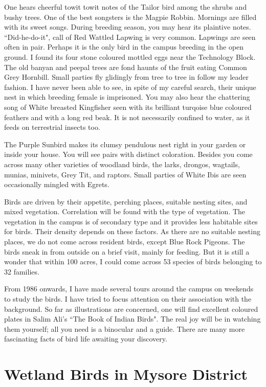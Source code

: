 One hears cheerful towit towit notes of the Tailor bird among the 
shrubs and bushy trees. One of the best songsters is the Magpie Robbin. 
Mornings are filled with its sweet songs. During breeding season, you may 
hear its plaintive notes. ``Did-he-do-it", call of Red Wattled Lapwing is very 
common. Lapwings are seen often in pair. Perhaps it is the only bird in the 
campus breeding in the open ground. I found its four stone coloured mottled 
eggs near the Technology Block. The old banyan and peepal trees are fond 
haunts of the fruit eating Common Grey Hornbill. Small parties fly 
glidingly from tree to tree in follow my leader fashion. I have never been 
able to see, in spite of my careful search, their unique nest in which breeding 
female is imprisoned. You may also hear the chattering song of 
White breasted Kingfisher seen with its brilliant turqoise blue coloured 
feathers and with a long red beak. It is not necessarily confined to water, as 
it feeds on terrestrial insects too. 

The Purple Sunbird makes its clumsy pendulous nest right in your 
garden or inside your house. You will see pairs with distinct coloration. 
Besides you come across many other varieties of woodland birds, the larks, 
drongos, wagtails, munias, minivets, Grey Tit, and raptors. Small parties of 
White Ibis are seen occasionally mingled with Egrets. 

Birds are driven by their appetite, perching places, suitable nesting 
sites, and mixed vegetation. Correlation will be found with the type of 
vegetation. The vegetation in the campus is of secondary 
type and it provides less habitable sites for birds. Their density depends on 
these factors. As there are no suitable nesting places, we do not come across 
resident birds, except Blue Rock Pigeons. The birds sneak in from outside on a brief visit, 
mainly for feeding. But it is still a wonder that within 100 acres, I could 
come across 53 species of birds belonging to 32 families. 

From 1986 onwards, I have made several tours around the campus on 
weekends to study the birds. I have tried to focus attention on their 
association with the background. So far as illustrations are concerned, one 
will find excellent coloured plates in Salim Ali's ``The Book of Indian 
Birds". The real joy will be in watching them yourself; all you need is a
binocular and a guide. There are many more fascinating facts of bird life 
awaiting your discovery. 

\chapter{Wetland Birds in Mysore District} 


